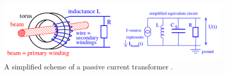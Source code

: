 \begin{figure}[!ht]
	\begin{center}
		\includegraphics[width=\textwidth]{02_BeamDiag/figures/fig000_CT}
	\end{center}
	\caption[A simplified schema of a passive current transformer]{A simplified scheme of a passive current transformer \cite{ForkJUAS}.}
	\label{chap2:fig:CT}
\end{figure}
